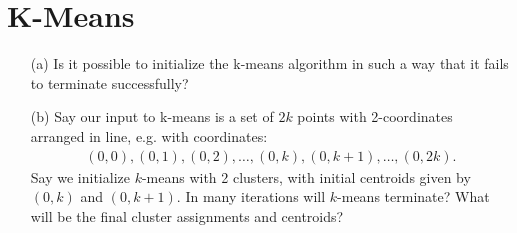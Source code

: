 \documentclass[11pt]{article}
\begin{document}
\begin{answertext}{23cm}{}
\end{answertext} 

\pagebreak


\section*{K-Means}

\begin{enumerate}
\item[(a)] Is it possible to initialize the k-means algorithm in such a way that it fails to terminate successfully?

\item[(b)] Say our input to k-means is a set of $2k$ points with 2-coordinates arranged in line, e.g. with coordinates:
{\small
\begin{align*}
(0,0), (0,1), (0, 2), \ldots, (0,k), (0,k+1), \ldots, (0,2k).
\end{align*}
}
Say we initialize $k$-means with 2 clusters, with initial centroids given by $(0,k)$ and $(0,k+1)$.  In many iterations will $k$-means terminate?  What will be the final cluster assignments and centroids?
\end{enumerate}
\end{document}
